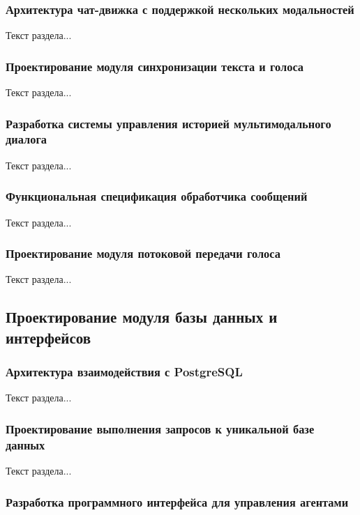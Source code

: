 \subsubsection{Архитектура чат-движка с поддержкой нескольких модальностей}

Текст раздела...

\subsubsection{Проектирование модуля синхронизации текста и голоса}

Текст раздела...

\subsubsection{Разработка системы управления историей мультимодального диалога}

Текст раздела...

\subsubsection{Функциональная спецификация обработчика сообщений}

Текст раздела...

\subsubsection{Проектирование модуля потоковой передачи голоса}

Текст раздела...

\subsection{Проектирование модуля базы данных и интерфейсов}

\subsubsection{Архитектура взаимодействия с PostgreSQL}

Текст раздела...

\subsubsection{Проектирование выполнения запросов к уникальной базе данных}

Текст раздела...

\subsubsection{Разработка программного интерфейса для управления агентами}

